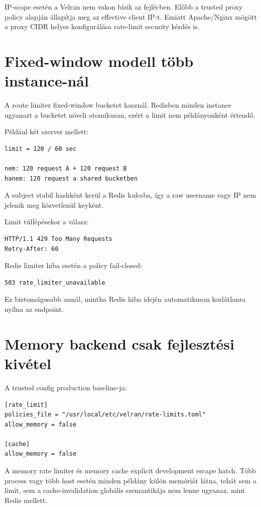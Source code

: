 IP-scope esetén a Velran nem vakon bízik az  fejlécben. Előbb a trusted proxy policy alapján állapítja meg az effective client IP-t. Emiatt Apache/Nginx mögött a proxy CIDR helyes konfigurálása rate-limit security kérdés is.

\section{Fixed-window modell több instance-nál}

A route limiter fixed-window bucketet használ. Redisben minden instance ugyanazt a bucketet növeli atomikusan, ezért a limit nem példányonként értendő.

Például két szerver mellett:

\begin{lstlisting}
limit = 120 / 60 sec

nem: 120 request A + 120 request B
hanem: 120 request a shared bucketben
\end{lstlisting}

A subject stabil hashként kerül a Redis kulcsba, így a raw username vagy IP nem jelenik meg közvetlenül keyként.

Limit túllépésekor a válasz:

\begin{lstlisting}
HTTP/1.1 429 Too Many Requests
Retry-After: 60
\end{lstlisting}

Redis limiter hiba esetén a policy fail-closed:

\begin{lstlisting}
503 rate_limiter_unavailable
\end{lstlisting}

Ez biztonságosabb annál, mintha Redis hiba idején automatikusan korlátlanra nyílna az endpoint.

\section{Memory backend csak fejlesztési kivétel}

A trusted config production baseline-ja:

\begin{lstlisting}
[rate_limit]
policies_file = "/usr/local/etc/velran/rate-limits.toml"
allow_memory = false

[cache]
allow_memory = false
\end{lstlisting}

A memory rate limiter és memory cache explicit development escape hatch. Több process vagy több host esetén minden példány külön memóriát látna, tehát sem a limit, sem a cache-invalidation globális szemantikája nem lenne ugyanaz, mint Redis mellett.

